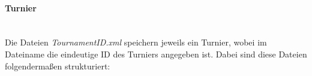 \documentclass[11pt]{article}
\newcommand{\subsubsubsection}[1]{\paragraph{#1}\mbox{}\\}
\begin{document}

\subsubsubsection{Turnier}

Die Dateien \textit{TournamentID.xml} speichern jeweils ein Turnier, wobei im Dateiname die eindeutige ID des Turniers angegeben ist. Dabei sind diese Dateien folgendermaßen strukturiert:
\vspace{0.4cm}
\end{document}
